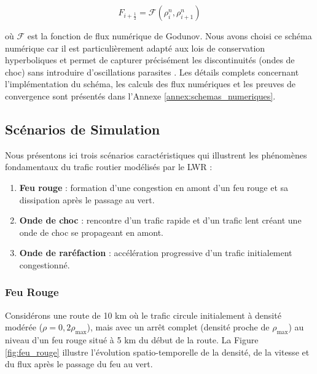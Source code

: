 \begin{equation}
    F_{i+\frac{1}{2}} = \mathcal{F}(\rho_i^n, \rho_{i+1}^n)
\end{equation}
    
où $\mathcal{F}$ est la fonction de flux numérique de Godunov. Nous avons choisi ce schéma numérique car il est particulièrement adapté aux lois de conservation hyperboliques et permet de capturer précisément les discontinuités (ondes de choc) sans introduire d'oscillations parasites \cite{toro2013riemann}. Les détails complets concernant l'implémentation du schéma, les calculs des flux numériques et les preuves de convergence sont présentés dans l'Annexe \ref{annex:schemas_numeriques}.
    
\subsection{Scénarios de Simulation}
\label{subsec:scenarios}

Nous présentons ici trois scénarios caractéristiques qui illustrent les phénomènes fondamentaux du trafic routier modélisés par le LWR :

\begin{enumerate}
    \item \textbf{Feu rouge} : formation d'une congestion en amont d'un feu rouge et sa dissipation après le passage au vert.
    \item \textbf{Onde de choc} : rencontre d'un trafic rapide et d'un trafic lent créant une onde de choc se propageant en amont.
    \item \textbf{Onde de raréfaction} : accélération progressive d'un trafic initialement congestionné.
\end{enumerate}

\subsubsection{Feu Rouge}
\label{subsubsec:feu_rouge}

Considérons une route de 10 km où le trafic circule initialement à densité modérée ($\rho = 0,2\rho_{\max}$), mais avec un arrêt complet (densité proche de $\rho_{\max}$) au niveau d'un feu rouge situé à 5 km du début de la route. La Figure \ref{fig:feu_rouge} illustre l'évolution spatio-temporelle de la densité, de la vitesse et du flux après le passage du feu au vert.

